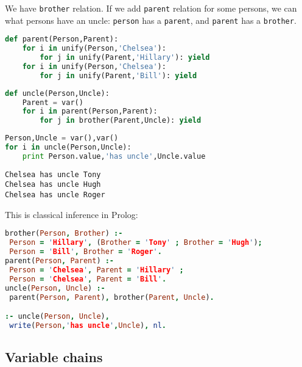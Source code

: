 We have \verb|brother| relation. If we add \verb|parent| relation
for some persons, we can  what persons have an uncle: \verb|person|
has a \verb|parent|, and \verb|parent| has a \verb|brother|.
\begin{lstlisting}[language=Python]
def parent(Person,Parent):
	for i in unify(Person,'Chelsea'):
		for j in unify(Parent,'Hillary'): yield
	for i in unify(Person,'Chelsea'):
		for j in unify(Parent,'Bill'): yield
\end{lstlisting}
\begin{lstlisting}[language=Python]
def uncle(Person,Uncle):
	Parent = var()
	for i in parent(Person,Parent):
		for j in brother(Parent,Uncle): yield
\end{lstlisting}
\begin{lstlisting}[language=Python]
Person,Uncle = var(),var()
for i in uncle(Person,Uncle):
	print Person.value,'has uncle',Uncle.value
\end{lstlisting}
\begin{lstlisting}
Chelsea has uncle Tony
Chelsea has uncle Hugh
Chelsea has uncle Roger
\end{lstlisting}
This is classical inference in Prolog:
\begin{lstlisting}[language=Prolog]
brother(Person, Brother) :-
 Person = 'Hillary', (Brother = 'Tony' ; Brother = 'Hugh');
 Person = 'Bill', Brother = 'Roger'.
parent(Person, Parent) :-
 Person = 'Chelsea', Parent = 'Hillary' ;
 Person = 'Chelsea', Parent = 'Bill'.
uncle(Person, Uncle) :-
 parent(Person, Parent), brother(Parent, Uncle).

:- uncle(Person, Uncle),
 write(Person,'has uncle',Uncle), nl.
\end{lstlisting}

\subsection{Variable chains}

